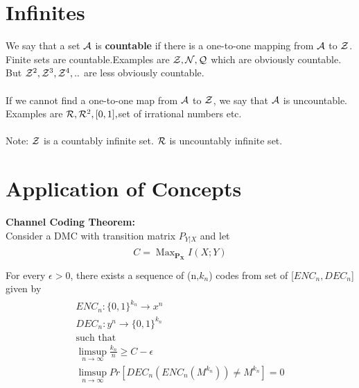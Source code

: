 \documentclass[a4paper]{article}
\DeclareMathOperator*{\maxi}{Max}
\begin{document}
\section{Infinites}
We say that a set $\mathcal A$ is \textbf{countable} if there is a one-to-one mapping from $\mathcal A$ to $\mathcal Z$. Finite sets are countable.Examples are $\mathcal Z,\mathcal N,\mathcal Q$ which are obviously countable. But $\mathcal Z^2,\mathcal Z^3,\mathcal Z^4,..$ are less obviously countable. \\
\\
If we cannot find a one-to-one map from $\mathcal A$ to $\mathcal Z$, we say that $\mathcal A$ is uncountable. Examples are $\mathcal R,\mathcal R^2,[0,1],$set of irrational numbers etc.\\
\\
Note: $\mathcal Z$ is a countably infinite set. $\mathcal R$ is uncountably infinite set.
\section{Application of Concepts}
\textbf{Channel Coding Theorem:}
\\
Consider a DMC with transition matrix $P_{Y|X}$ and let 
\begin{align}
\begin{split}
C=\maxi_{\mathbf{P_X}} I(X;Y)\\
\end{split}
\end{align}
For every $\epsilon>0$, there exists a sequence of (n,$k_n$) codes from set of [$ENC_n,DEC_n$] given by\\
\begin{align}
\begin{split}
ENC_n : \{0,1\}^{k_n} \to x^{n}\\
DEC_n : y^{n} \to \{0,1\}^{k_n}\\
\text{such that}\\
\limsup_{n \to \infty} \frac{k_n}{n} \geq C-\epsilon\\
\limsup_{n \to \infty} Pr[DEC_n (ENC_n (M^{k_n}))\neq M^{k_n}] = 0\\
\end{split}
\end{align}


\end{document}
